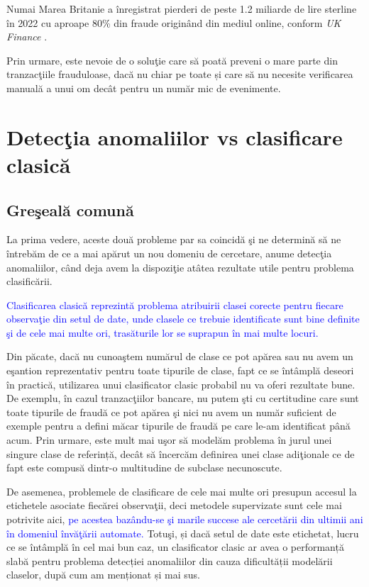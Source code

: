 Numai Marea Britanie a înregistrat pierderi de peste 1.2 
miliarde de lire sterline în 2022 cu aproape 80\% din fraude
originând din mediul online, conform \textit{UK Finance}
\cite{uk-finance}.

Prin urmare, este nevoie de o soluţie care să poată 
preveni o mare parte din tranzacţiile frauduloase, dacă
nu chiar pe toate și care să nu necesite verificarea manuală
a unui om decât pentru un număr mic de evenimente.


\section{Detecţia anomaliilor vs clasificare clasică}

\subsection{Greşeală comună}

La prima vedere, aceste două probleme par sa coincidă şi ne determină
să ne întrebăm de ce a mai apărut un nou domeniu de cercetare, anume detecţia
anomaliilor, când deja avem la dispoziţie atâtea rezultate utile pentru 
problema clasificării. 

\textcolor{blue}{Clasificarea clasică reprezintă problema 
atribuirii clasei corecte pentru fiecare observaţie din setul de date,
unde clasele ce trebuie identificate sunt bine definite şi de cele mai
multe ori, trasăturile lor se suprapun în mai multe locuri.}

Din păcate, dacă nu cunoaştem numărul de clase ce pot apărea 
sau nu avem un eşantion reprezentativ pentru toate tipurile de clase, fapt ce se 
întâmplă deseori în practică, utilizarea unui clasificator clasic probabil 
nu va oferi rezultate bune. De exemplu, 
în cazul tranzacţiilor bancare, nu putem şti cu certitudine care sunt toate 
tipurile de fraudă ce pot apărea şi nici nu avem un număr suficient de exemple 
pentru a defini măcar tipurile de fraudă pe care le-am identificat până acum.
Prin urmare, este mult mai uşor să modelăm problema în jurul unei singure clase 
de referință, decât să încercăm definirea unei clase adiţionale ce de fapt 
este compusă dintr-o multitudine de subclase necunoscute.

De asemenea, problemele de clasificare de cele mai multe ori presupun 
accesul la etichetele asociate fiecărei observaţii, deci metodele 
supervizate sunt cele mai potrivite aici, \textcolor{blue}{pe acestea bazându-se
şi marile succese ale cercetării din ultimii ani în domeniul învăţării automate.} 
Totuşi, și dacă setul de date 
este etichetat, lucru ce se întâmplă în cel mai bun caz, un clasificator 
clasic ar avea o performanță slabă pentru problema detecției anomaliilor
din cauza dificultății modelării claselor, după cum am menționat și mai sus.

